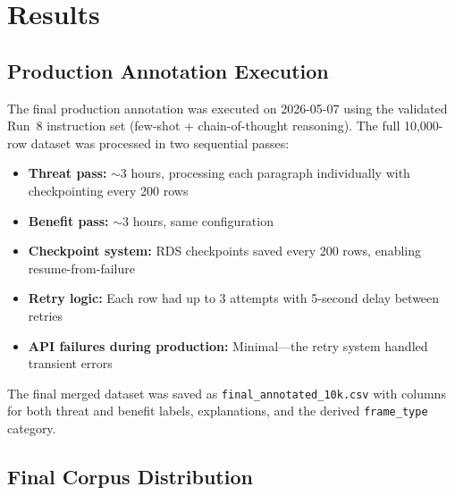 \section{Results}
\label{sec:results}

\subsection{Production Annotation Execution}

The final production annotation was executed on 2026-05-07 using the validated Run~8 instruction set (few-shot + chain-of-thought reasoning). The full 10,000-row dataset was processed in two sequential passes:

\begin{itemize}
    \item \textbf{Threat pass:} $\sim$3 hours, processing each paragraph individually with checkpointing every 200 rows
    \item \textbf{Benefit pass:} $\sim$3 hours, same configuration
    \item \textbf{Checkpoint system:} RDS checkpoints saved every 200 rows, enabling resume-from-failure
    \item \textbf{Retry logic:} Each row had up to 3 attempts with 5-second delay between retries
    \item \textbf{API failures during production:} Minimal---the retry system handled transient errors
\end{itemize}

The final merged dataset was saved as \texttt{final\_annotated\_10k.csv} with columns for both threat and benefit labels, explanations, and the derived \texttt{frame\_type} category.

\subsection{Final Corpus Distribution}


